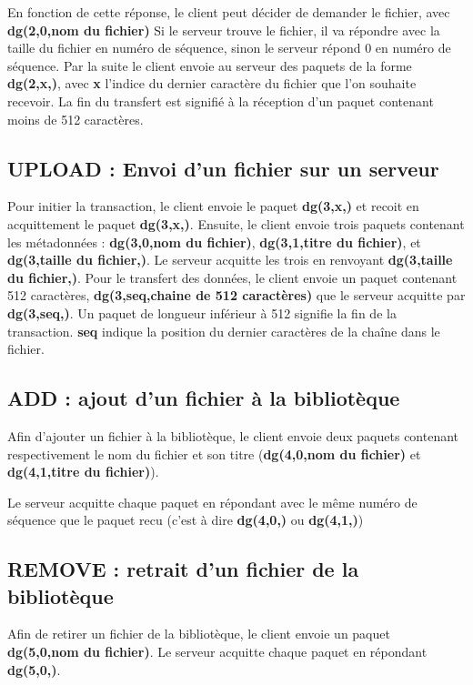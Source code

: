 \documentclass[10pt,a4paper]{article}
\begin{document}
En fonction de cette réponse, le client peut décider de demander le fichier, avec \textbf{dg(2,0,nom du fichier)}
Si le serveur trouve le fichier, il va répondre avec la taille du fichier en numéro de séquence, sinon le serveur répond 0 en numéro de séquence.
Par la suite le client envoie au serveur des paquets de la forme \textbf{dg(2,x,)}, avec \textbf{x} l'indice du dernier caractère du fichier que l'on souhaite recevoir.
La fin du transfert est signifié à la réception d'un paquet contenant moins de 512 caractères.

\subsection{UPLOAD : Envoi d'un fichier sur un serveur}
Pour initier la transaction, le client envoie le paquet \textbf{dg(3,x,)} et recoit en acquittement le paquet \textbf{dg(3,x,)}.
Ensuite, le client envoie trois paquets contenant les métadonnées : \textbf{dg(3,0,nom du fichier)}, \textbf{dg(3,1,titre du fichier)}, et \textbf{dg(3,taille du fichier,)}. Le serveur acquitte les trois en renvoyant \textbf{dg(3,taille du fichier,)}.
Pour le transfert des données, le client envoie un paquet contenant 512 caractères, \textbf{dg(3,seq,chaine de 512 caractères)} que le serveur acquitte par \textbf{dg(3,seq,)}.
Un paquet de longueur inférieur à 512 signifie la fin de la transaction. \textbf{seq} indique la position du dernier caractères de la chaîne dans le fichier.

\subsection{ADD : ajout d'un fichier à la bibliotèque}
Afin d'ajouter un fichier à la bibliotèque, le client envoie deux paquets contenant respectivement le nom du fichier et son titre (\textbf{dg(4,0,nom du fichier)} et \textbf{dg(4,1,titre du fichier)}).

Le serveur acquitte chaque paquet en répondant avec le même numéro de séquence que le paquet recu (c'est à dire \textbf{dg(4,0,)} ou \textbf{dg(4,1,)})

\subsection{REMOVE : retrait d'un fichier de la bibliotèque}
Afin de retirer un fichier de la bibliotèque, le client envoie un paquet \textbf{dg(5,0,nom du fichier)}.
Le serveur acquitte chaque paquet en répondant \textbf{dg(5,0,)}.
\end{document}
